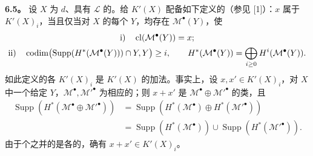 \textbf{6.5。} 设 $X$ 为 $d$、具有 $\mathcal L$ 的。给 $K'(X)$ 配备如下定义的（参见 [1]）：$x$ 属于 $K'(X)_i$，当且仅当对 $X$ 的每个 $Y$，均存在 $\mathcal M^\bullet(Y)$，使
\[
\begin{gathered}
\textup{i)}\quad \operatorname{cl}(\mathcal M^\bullet(Y))=x;\\
\textup{ii)}\quad \operatorname{codim}\bigl(\operatorname{Supp}(H^*(\mathcal M^\bullet(Y)))\cap Y,Y\bigr)\geq i,\qquad
H^*(\mathcal M^\bullet(Y))=\bigoplus_{i\geq0}H^i(\mathcal M^\bullet(Y)).
\end{gathered}
\]
如此定义的各 $K'(X)_i$ 是 $K'(X)$ 的加法。事实上，设 $x,x'\in K'(X)_i$，对 $X$ 中一个给定 $Y$，$\mathcal M^\bullet,\mathcal M'^\bullet$ 为相应的；则 $x+x'$ 是 $\mathcal M^\bullet\oplus\mathcal M'^\bullet$ 的类，且
\[
\begin{aligned}
\operatorname{Supp}(H^*(\mathcal M^\bullet\oplus\mathcal M'^\bullet))
&=\operatorname{Supp}(H^*(\mathcal M^\bullet)\oplus H^*(\mathcal M'^\bullet))\\
&=\operatorname{Supp}(H^*(\mathcal M^\bullet))\cup\operatorname{Supp}(H^*(\mathcal M'^\bullet)).
\end{aligned}
\]
由于个之并的是各的，确有 $x+x'\in K'(X)_i$。

